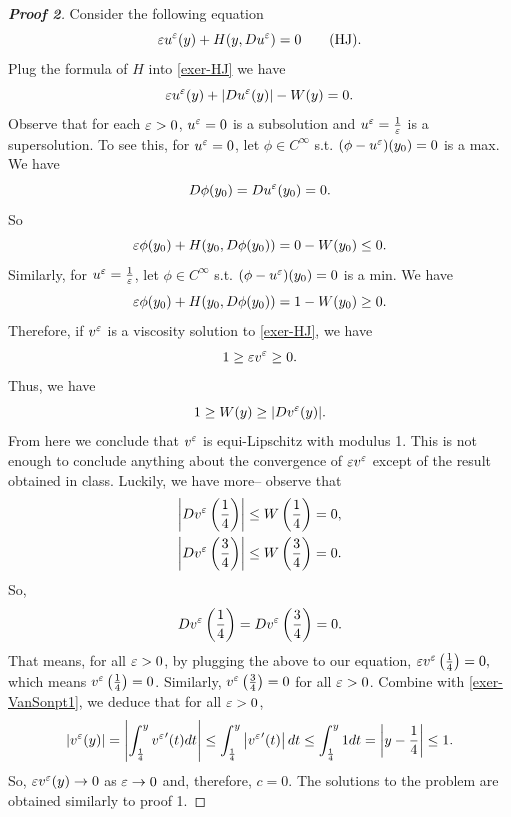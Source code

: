 \documentclass[12pt, oneside]{amsart}  	%
\begin{document}
\begin{proof}[\textbf{Proof 2}]
Consider the following equation
\begin{equation}\label{exer-HJ}
		\varepsilon u^\varepsilon(y) + H(y,Du^\varepsilon)=0 \tag{HJ}.
\end{equation}
Plug the formula of $H$ into \eqref{exer-HJ} we have
\begin{equation*}
	 	\varepsilon u^\varepsilon(y)+ |Du^\varepsilon(y)|-W(y)=0.
\end{equation*}
Observe that for each $\varepsilon>0$, $u^\varepsilon=0$ is a subsolution and $u^\varepsilon=\frac{1}{\varepsilon}$ is a supersolution. To see this, for $u^\varepsilon=0$, let $\phi\in C^\infty$ s.t. $(\phi-u^\varepsilon)(y_0)=0$ is a max. We have
$$D\phi(y_0)=Du^\varepsilon(y_0)=0.$$
So $$\varepsilon \phi(y_0) + H(y_0, D\phi(y_0))=0-W(y_0) \le 0.$$
Similarly, for $u^\varepsilon=\frac{1}{\varepsilon}$, let $\phi\in C^\infty$ s.t. $(\phi-u^\varepsilon)(y_0)=0$ is a min. We have
$$\varepsilon \phi(y_0) + H(y_0, D\phi(y_0))=1-W(y_0) \ge 0.$$
Therefore, if $v^\varepsilon$ is a viscosity solution to \eqref{exer-HJ}, we have
	 $$1\ge \varepsilon v^\varepsilon \ge 0.$$
Thus, we have
\begin{equation}\label{exer-VanSonpt1}
	 	1\ge W(y) \ge |Dv^\varepsilon(y)|.
\end{equation}
From here we conclude that $v^\varepsilon$ is equi-Lipschitz with modulus 1. This is not enough to conclude anything about the convergence of $\varepsilon v^\varepsilon$ except of the result obtained in class. Luckily, we have more-- observe that
\begin{eqnarray*}
	 	\left|Dv^\varepsilon\left(\frac{1}{4}\right)\right| \le W\left(\frac{1}{4}\right) =0,\\
	 	\left|Dv^\varepsilon\left(\frac{3}{4}\right)\right| \le W\left(\frac{3}{4}\right) =0.
\end{eqnarray*}
So,
	 $$Dv^\varepsilon\left(\frac{1}{4}\right)=Dv^\varepsilon\left(\frac{3}{4}\right)=0.$$
That means, for all $\varepsilon>0$, by plugging the above to our equation, $\varepsilon v^\varepsilon\left(\frac{1}{4}\right)=0,$ which means $v^\varepsilon\left(\frac{1}{4}\right)=0$. Similarly, $v^\varepsilon\left(\frac{3}{4}\right)=0$ for all $\varepsilon>0$. Combine with \eqref{exer-VanSonpt1}, we deduce that for all $\varepsilon>0$,
	 $$|v^\varepsilon(y)| = \left|\int_{\frac{1}{4}}^y {v^\varepsilon} '(t) dt\right| \le \int_{\frac{1}{4}}^y \left|{v^\varepsilon} '(t)\right| dt \le \int_{\frac{1}{4}}^y 1 dt =\left|y-\frac{1}{4}\right|\le 1.$$
So, $\varepsilon v^\varepsilon(y)\to 0$ as $\varepsilon\to 0$ and, therefore, $c=0$. The solutions to the problem are obtained similarly to proof 1.
\end{proof}
\vspace*{0.5cm}
\end{document}
